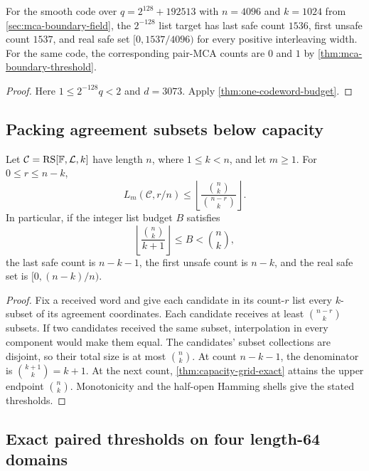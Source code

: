 \begin{corollary}
\label{cor:boundary-field-list}
For the smooth code over \(q=2^{128}+192513\) with \(n=4096\) and
\(k=1024\) from \cref{sec:mca-boundary-field}, the \(2^{-128}\) list target
has last safe count \(1536\), first unsafe count \(1537\), and real safe
set \([0,1537/4096)\) for every positive interleaving width. For the same
code, the corresponding pair-MCA counts are \(0\) and \(1\) by
\cref{thm:mca-boundary-threshold}.
\end{corollary}

\begin{proof}
Here \(1\le2^{-128}q<2\) and \(d=3073\). Apply
\cref{thm:one-codeword-budget}.
\end{proof}

\subsection{Packing agreement subsets below capacity}

\begin{theorem}
\label{thm:list-agreement-packing}
Let \(\mathcal C=\operatorname{RS}[\mathbb{F},\mathcal L,k]\) have length \(n\), where
\(1\le k<n\), and let \(m\ge1\). For \(0\le r\le n-k\),
\[
  L_m(\mathcal C,r/n)\le
  \left\lfloor\frac{\binom nk}{\binom{n-r}k}\right\rfloor.
\]
In particular, if the integer list budget \(B\) satisfies
\[
  \left\lfloor\frac{\binom nk}{k+1}\right\rfloor\le B<\binom nk,
\]
the last safe count is \(n-k-1\), the first unsafe count is \(n-k\),
and the real safe set is \([0,(n-k)/n)\).
\end{theorem}

\begin{proof}
Fix a received word and give each candidate in its count-\(r\) list every
\(k\)-subset of its agreement coordinates. Each candidate receives at least
\(\binom{n-r}{k}\) subsets. If two candidates received the same subset,
interpolation in every component would make them equal. The candidates'
subset collections are disjoint, so their total size is at most \(\binom nk\).
At count \(n-k-1\), the denominator is \(\binom{k+1}k=k+1\).
At the next count, \cref{thm:capacity-grid-exact} attains the upper endpoint
\(\binom nk\). Monotonicity and the half-open Hamming shells give the
stated thresholds.
\end{proof}

\subsection{Exact paired thresholds on four length-64 domains}
\label{sec:jo-paired-thresholds}

